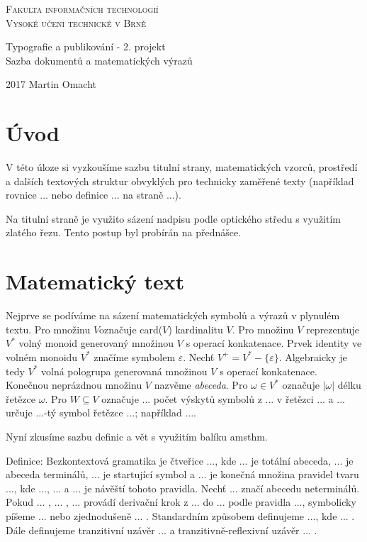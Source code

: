 \documentclass[11pt, a4paper, twocolumn]{article}
\begin{document}
	\begin{titlepage}
		\begin{center}
			{\linespread{0.75}
				\Huge
				\textsc{Fakulta informačních technologií\\ Vysoké učení technické v Brně}
			}

			{\linespread{0.8}
				\LARGE
				Typografie a publikování - 2. projekt\\
				Sazba dokumentů a matematických výrazů
			}
		\end{center}		
		{\Large 2017 \hfill Martin Omacht}
	\end{titlepage}

	\section{Úvod} %
	\label{sec:úvod}
	V této úloze si vyzkoušíme sazbu titulní strany, matematických vzorců, prostředí a dalších textových struktur obvyklých pro technicky zaměřené texty (například rovnice ... nebo definice ... na straně ...).

	Na titulní straně je využito sázení nadpisu podle optického středu s využitím zlatého řezu. Tento postup byl probírán na přednášce.

	\section{Matematický text} %
	\label{sec:matematický_text}
	Nejprve se podíváme na sázení matematických symbolů a výrazů v plynulém textu. Pro množinu $V$označuje card($V$) kardinalitu $V$.
	Pro množinu $V$ reprezentuje $V^\ast$ volný monoid generovaný množinou $V$ s operací konkatenace.
	Prvek identity ve volném monoidu $V^*$ značíme symbolem $\varepsilon$.
	Nechť $V^+ = V^\ast - \{\varepsilon\}$. Algebraicky je tedy $V^\ast$ volná pologrupa generovaná množinou $V$ s operací konkatenace.
	Konečnou neprázdnou množinu $V$ nazvěme \emph{abeceda}.
	Pro $\omega \in V^\ast$ označuje $|\omega|$ délku řetězce $\omega$. Pro $W \subseteq V$ označuje ... počet výskytů symbolů z ... v řetězci ... a ... určuje ...-tý symbol řetězce ...; například ....

	Nyní zkusíme sazbu definic a vět s využitím balíku amsthm.

	Definice: Bezkontextová gramatika je čtveřice ..., kde ... je totální abeceda,
	... je abeceda terminálů, ... je startující symbol a ... je konečná množina pravidel
	tvaru ..., kde ..., ... a ... je návěští tohoto pravidla. Nechť ... značí abecedu neterminálů.
	Pokud ... , ... , ... provádí derivační krok z ... do ... podle pravidla ..., symbolicky píšeme 
	... nebo zjednodušeně ... . Standardním způsobem definujeme ..., kde ... . Dále definujeme 
	tranzitivní uzávěr ... a tranzitivně-reflexivní uzávěr ... .
\end{document}
